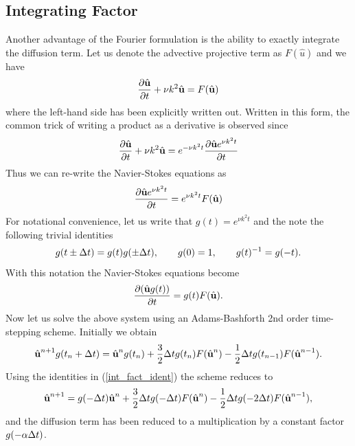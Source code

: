 \subsection{Integrating Factor}
Another advantage of the Fourier formulation is the ability to exactly integrate the diffusion term. Let us denote the advective projective term as $F(\hat{u})$ and we have
\begin{align}
\frac{\partial \hat{\textbf{u}}}{\partial t} + \nu k^{2}\hat{\textbf{u}} = F(\hat{\textbf{u}}) 
\end{align}
where the left-hand side has been explicitly written out. Written in this form, the common trick of writing a product as a derivative is observed since
\begin{align}
 \frac{\partial \hat{\textbf{u}}}{\partial t} + \nu k^{2}\hat{\textbf{u}}= e^{-\nu k^{2}t}\frac{\partial \hat{\textbf{u}} e^{\nu k^{2}t}}{\partial t} 
\end{align}
Thus we can re-write the Navier-Stokes equations as 
\begin{align}
\frac{\partial \hat{\textbf{u}} e^{\nu k^{2}t}}{\partial t} = e^{\nu k^{2}t}F(\hat{\textbf{u}})
\end{align}
For notational convenience, let us write that $g(t) = e^{\nu k^{2}t}$ and the note the following trivial identities
\begin{align}
g(t\pm\Delta t) = g(t)g(\pm\Delta t),\qquad g(0) = 1, \qquad g(t)^{-1} = g(-t).\label{int_fact_ident}
\end{align}
With this notation the Navier-Stokes equations become
\begin{align}
\frac{\partial (\hat{\textbf{u}} g(t))}{\partial t} = g(t)F(\hat{\textbf{u}}).
\end{align}
 Now let us solve the above system using an Adams-Bashforth 2nd order time-stepping scheme. Initially we obtain
\begin{align}
\hat{\textbf{u}}^{n+1}g(t_{n}+\Delta t) = \hat{\textbf{u}}^{n}g(t_{n}) + \frac{3}{2}\Delta t g(t_{n})F(\hat{\textbf{u}}^{n}) - \frac{1}{2}\Delta t g(t_{n-1})F(\hat{\textbf{u}}^{n-1}).
\end{align}
Using the identities in (\ref{int_fact_ident}) the scheme reduces to
\begin{align}
\hat{\textbf{u}}^{n+1} = g(-\Delta t)\hat{\textbf{u}}^{n} + \frac{3}{2}\Delta t g(-\Delta t)F(\hat{\textbf{u}}^{n}) - \frac{1}{2}\Delta t g(-2\Delta t)F(\hat{\textbf{u}}^{n-1}),
\end{align}
and the diffusion term has been reduced to a multiplication by a constant factor $g(-\alpha\Delta t)$.

